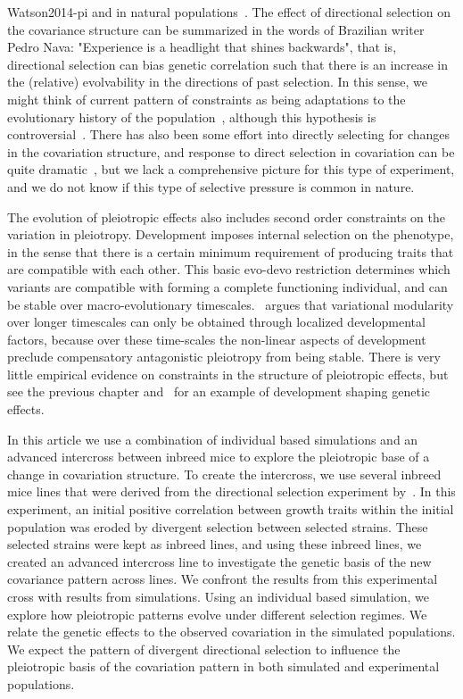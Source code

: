 \begin{refsection}
{Watson2014-pi} and in natural populations~\parencite{Penna2017-if,
Assis2016-vz, Roff2012-fe}. The effect of directional selection on the
covariance structure can be summarized in the words of Brazilian writer Pedro
Nava: "Experience is a headlight that shines backwards", that is, directional
selection can bias genetic correlation such that there is an increase in the
(relative) evolvability in the directions of past selection. In this sense, we
might think of current pattern of constraints as being adaptations to the
evolutionary history of the population~\parencite{Draghi2008-cv}, although
this hypothesis is controversial~\parencite{Lynch2007-kz, Lynch2007-ch}. There
has also been some effort into directly selecting for changes in the
covariation structure, and response to direct selection in covariation can be
quite dramatic~\parencite{Delph2011-bc}, but we lack a comprehensive picture
for this type of experiment, and we do not know if this type of selective
pressure is common in nature.

The evolution of pleiotropic effects also includes second order constraints on
the variation in pleiotropy. Development imposes internal selection on the
phenotype, in the sense that there is a certain minimum requirement of
producing traits that are compatible with each other. This basic evo-devo
restriction determines which variants are compatible with forming a complete
functioning individual, and can be stable over macro-evolutionary
timescales.~\textcite{Mitteroecker2009-jb} argues that variational modularity
over longer timescales can only be obtained through localized developmental
factors, because over these time-scales the non-linear aspects of development
preclude compensatory antagonistic pleiotropy from being stable. There is very little
empirical evidence on constraints in the structure of pleiotropic effects, but
see the previous chapter and~\textcite{Pavlicev2016-jh} for an example of
development shaping genetic effects.

In this article we use a combination of individual based
simulations and an advanced intercross between inbreed mice to explore the
pleiotropic base of a change in covariation structure. To create the
intercross, we use several inbreed mice lines that were derived from the
directional selection experiment by~\textcite{Atchley1997-vn}. In this
experiment, an initial positive correlation between growth traits within the
initial population was eroded by divergent selection between selected strains.
These selected strains were kept as inbreed lines, and using these inbreed lines, we
created an advanced intercross line to investigate the genetic basis of the new
covariance pattern across lines. We confront the results from this
experimental cross with results from simulations. Using an individual based
simulation, we explore how pleiotropic patterns evolve under different
selection regimes. We relate the genetic effects to the observed covariation
in the simulated populations. We expect the pattern of divergent directional
selection to influence the pleiotropic basis of the covariation pattern in
both simulated and experimental populations.



\end{refsection}
